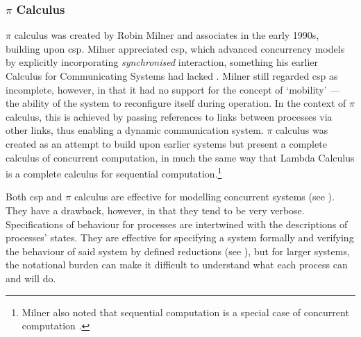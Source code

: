 \subsubsection{\(\pi\) Calculus}
\(\pi\) calculus was created by Robin Milner and associates in the early 1990s, building upon \gls{csp}.  Milner appreciated \gls{csp}, which advanced concurrency models by explicitly incorporating \emph{synchronised} interaction, something his earlier Calculus for Communicating Systems \cite{Milner1980} had lacked  \cite{Milner1993}.  Milner still regarded \gls{csp} as incomplete, however, in that it had no support for the concept of `mobility' --- \ie{} the ability of the system to reconfigure itself during operation.  In the context of \(\pi\) calculus, this is achieved by passing references to links between processes via other links, thus enabling a dynamic communication system. \(\pi\) calculus was created as an attempt to build upon earlier systems but present a complete calculus of concurrent computation, in much the same way that Lambda Calculus \cite{Barendregt1984} is a complete calculus for sequential computation.\footnote{Milner also noted that sequential computation is a special case of concurrent computation \cite{Milner1993}.}

Both \gls{csp} and \(\pi\) calculus are effective for modelling concurrent systems (see \eg{} \cite{Roscoe2011}).  They have a drawback, however, in that they tend to be very verbose.  Specifications of behaviour for processes are intertwined with the descriptions of processes' states.  They are effective for specifying a system formally and verifying the behaviour of said system by defined reductions (see \eg{} \cite[Ch.~3.2]{Varela2013}), but for larger systems, the notational burden can make it difficult to understand what each process can and will do.

